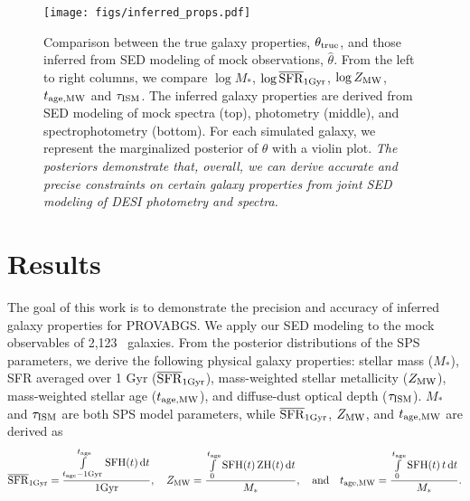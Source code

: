 \begin{figure}
\begin{center}
\texttt{[image: figs/inferred\_props.pdf]}
\caption{
    Comparison between the true galaxy properties, $\theta_{\rm true}$, and
    those inferred from SED modeling of mock observations, $\hat{\theta}$. 
    From the left to right columns, we compare $\log M_*$, $\log \overline{\rm SFR}_{\rm 1Gyr}$, 
    $\log Z_{\rm MW}$, $t_{\rm age, MW}$ and $\tau_{\rm ISM}$. 
    The inferred galaxy properties are derived from SED modeling of mock
    spectra (top), photometry (middle), and spectrophotometry (bottom). 
    For each simulated galaxy, we represent the marginalized posterior of
    $\theta$ with a violin plot.  %
    \emph{The posteriors demonstrate that, overall, we can derive accurate and 
    precise constraints on certain galaxy properties from joint SED modeling of
    DESI photometry and spectra.}
    } \label{fig:prop_inf}
\end{center}
\end{figure}

\section{Results} \label{sec:results}
The goal of this work is to demonstrate the precision and accuracy of inferred
galaxy properties for PROVABGS. 
We apply our SED modeling to the mock observables of 2,123 \lgal~galaxies.
From the posterior distributions of the SPS parameters, we derive the following
physical galaxy properties: stellar mass ($M_*$), SFR averaged over 1 Gyr
($\overline{\rm SFR}_{\rm 1Gyr}$), mass-weighted stellar metallicity ($Z_{\rm MW}$), mass-weighted
stellar age ($t_{\rm age, MW}$), and diffuse-dust optical depth ($\tau_{\rm ISM}$).
$M_*$ and $\tau_{\rm ISM}$ are both SPS model parameters, while $\overline{\rm SFR}_{\rm 1Gyr}$, 
$Z_{\rm MW}$, and $t_{\rm age, MW}$ are derived as 
\begin{equation} \label{eq:prop_eqs}
    \avgsfr = \frac{\int\limits_{t_{\rm age} - {\rm 1 Gyr}}^{t_{\rm age}}{\rm
    SFH}(t)\,{\rm d}t}{{\rm 1 Gyr}}, \quad
    Z_{\rm MW} = \frac{\int\limits_0^{t_{\rm age}}{\rm SFH}(t)\,{\rm
    ZH}(t)\,{\rm d}t}{M_*}, \quad{\rm and}\quad
    \tage = \frac{\int\limits_0^{t_{\rm age}}{\rm SFH}(t)\,t\,{\rm d}t}{M_*}.
\end{equation} 


